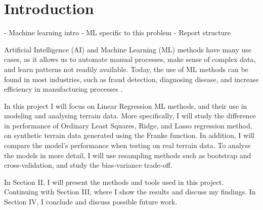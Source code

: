 \section{Introduction}\label{sec:introduction}
- Machine learning intro
- ML specific to this problem
- Report structure

Artificial Intelligence (AI) and Machine Learning (ML) methods have many use cases, as it allows us to automate manual processes, make sense of complex data, and learn patterns not readily available. Today, the use of ML methods can be found in most industries, such as fraud detection, diagnosing disease, and increase efficiency in manufacturing processes \cite{forbes:2023:machine_learning}. 

In this project I will focus on Linear Regression ML methods, and their use in modeling and analysing terrain data. More specifically, I will study the difference in performance of Ordinary Least Squares, Ridge, and Lasso regression method, on synthetic terrain data generated using the Franke function. In addition, I will compare the model's performance when testing on real terrain data. To analyse the models in more detail, I will use resampling methods such as bootstrap and cross-validation, and study the bias-variance trade-off.

In Section II, I will present the methods and tools used in this project. Continuing with Section III, where I show the results and discuss my findings. In Section IV, I conclude and discuss possible future work.